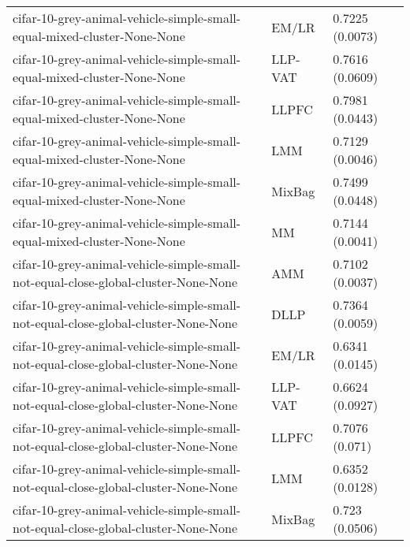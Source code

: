 \begin{longtable}{lll}
                                      cifar-10-grey-animal-vehicle-simple-small-equal-mixed-cluster-None-None &     EM/LR &                       0.7225 (0.0073) \\
                                      cifar-10-grey-animal-vehicle-simple-small-equal-mixed-cluster-None-None &   LLP-VAT &                       0.7616 (0.0609) \\
                                      cifar-10-grey-animal-vehicle-simple-small-equal-mixed-cluster-None-None &     LLPFC &                       0.7981 (0.0443) \\
                                      cifar-10-grey-animal-vehicle-simple-small-equal-mixed-cluster-None-None &       LMM &                       0.7129 (0.0046) \\
                                      cifar-10-grey-animal-vehicle-simple-small-equal-mixed-cluster-None-None &    MixBag &                       0.7499 (0.0448) \\
                                      cifar-10-grey-animal-vehicle-simple-small-equal-mixed-cluster-None-None &        MM &                       0.7144 (0.0041) \\
                           cifar-10-grey-animal-vehicle-simple-small-not-equal-close-global-cluster-None-None &       AMM &                       0.7102 (0.0037) \\
                           cifar-10-grey-animal-vehicle-simple-small-not-equal-close-global-cluster-None-None &      DLLP &                       0.7364 (0.0059) \\
                           cifar-10-grey-animal-vehicle-simple-small-not-equal-close-global-cluster-None-None &     EM/LR &                       0.6341 (0.0145) \\
                           cifar-10-grey-animal-vehicle-simple-small-not-equal-close-global-cluster-None-None &   LLP-VAT &                       0.6624 (0.0927) \\
                           cifar-10-grey-animal-vehicle-simple-small-not-equal-close-global-cluster-None-None &     LLPFC &                        0.7076 (0.071) \\
                           cifar-10-grey-animal-vehicle-simple-small-not-equal-close-global-cluster-None-None &       LMM &                       0.6352 (0.0128) \\
                           cifar-10-grey-animal-vehicle-simple-small-not-equal-close-global-cluster-None-None &    MixBag &                        0.723 (0.0506) \\

\end{longtable}
